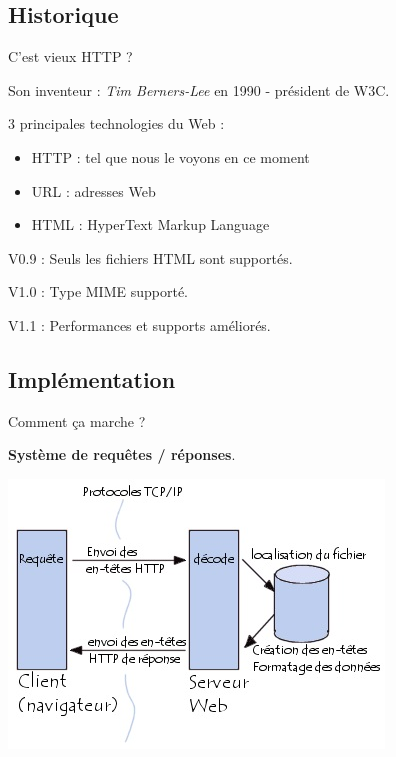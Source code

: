 \subsection{Historique}


\begin{frame}{C'est vieux HTTP ?}
	
Son inventeur : \emph{Tim Berners-Lee} en 1990 - président de W3C. \vspace{1em}

3 principales technologies du Web :
\begin{itemize}
\item HTTP : tel que nous le voyons en ce moment
\item URL : adresses Web
\item HTML : HyperText Markup Language
\end{itemize}
\vspace{1em}

V0.9 : Seuls les fichiers HTML sont supportés.

V1.0 : Type MIME supporté.

V1.1 : Performances et supports améliorés.

\end{frame}



\subsection{Implémentation}


\begin{frame}{Comment ça marche ?}

\begin{center}
\textbf{\large Système de requêtes / réponses}.

\vspace{1em}

\includegraphics[scale=0.75]{img_http/schema_http.jpg}
\end{center}

\end{frame}


